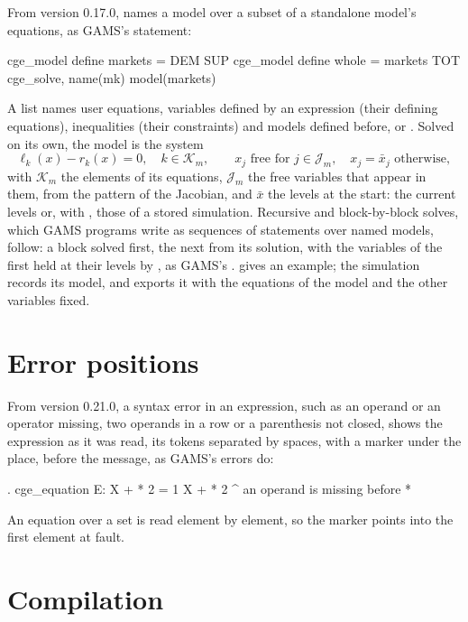 From version 0.17.0,  names a model over a subset of a
standalone model's equations, as GAMS's  statement:
\begin{stcode}
cge_model define markets = DEM SUP
cge_model define whole = markets TOT
cge_solve, name(mk) model(markets)
\end{stcode}
A list names user equations, variables defined by an expression (their
defining equations), inequalities (their constraints) and models defined
before, or . Solved on its own, the model is the system
\begin{equation*}
\ell_k(x) - r_k(x) = 0, \quad k \in \mathcal{K}_m, \qquad
x_j \text{ free for } j \in \mathcal{J}_m, \quad x_j = \bar x_j \text{ otherwise},
\end{equation*}
with $\mathcal{K}_m$ the elements of its equations, $\mathcal{J}_m$ the free
variables that appear in them, from the pattern of the Jacobian, and $\bar
x$ the levels at the start: the current levels or, with ,
those of a stored simulation. Recursive and block-by-block solves, which
GAMS programs write as sequences of  statements over named
models, follow: a block solved first, the next from its solution, with the
variables of the first held at their levels by , as GAMS's
.
 gives an example; the simulation records its model, and
 exports it with the equations of the model and the other
variables fixed.

\section{Error positions}\label{sec:errorpos}

From version 0.21.0, a syntax error in an expression, such as an operand or
an operator missing, two operands in a row or a parenthesis not closed, shows
the expression as it was read, its tokens separated by spaces, with a marker
under the place, before the message, as GAMS's \cmd{\$} errors do:
\begin{stcode}
. cge_equation E: X + * 2 = 1
    X + * 2
        ^
an operand is missing before *
\end{stcode}
An equation over a set is read element by element, so the marker points into
the first element at fault.

\section{Compilation}

